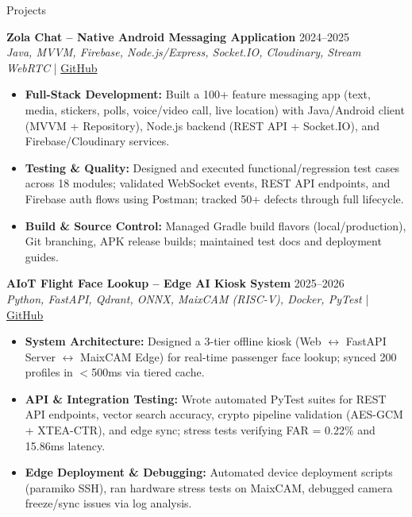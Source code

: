 \documentclass{resume}
\begin{document}
\begin{rSection}{Projects}
    \vspace{-0.6em}

    \item \textbf{Zola Chat -- Native Android Messaging Application} \hfill 2024--2025\\
    {\small \textit{Java, MVVM, Firebase, Node.js/Express, Socket.IO, Cloudinary, Stream WebRTC}} \hfill | \href{https://github.com/pckienuit}{GitHub}
    \begin{itemize}
        \itemsep -4pt {}
        \item \textbf{Full-Stack Development:} Built a 100+ feature messaging app (text, media, stickers, polls, voice/video call, live location) with Java/Android client (MVVM + Repository), Node.js backend (REST API + Socket.IO), and Firebase/Cloudinary services.
        \item \textbf{Testing \& Quality:} Designed and executed functional/regression test cases across 18 modules; validated WebSocket events, REST API endpoints, and Firebase auth flows using Postman; tracked 50+ defects through full lifecycle.
        \item \textbf{Build \& Source Control:} Managed Gradle build flavors (local/production), Git branching, APK release builds; maintained test docs and deployment guides.
    \end{itemize}

    \item \textbf{AIoT Flight Face Lookup -- Edge AI Kiosk System} \hfill 2025--2026\\
    {\small \textit{Python, FastAPI, Qdrant, ONNX, MaixCAM (RISC-V), Docker, PyTest}} \hfill | \href{https://github.com/pckienuit/AIoT_DoAn}{GitHub}
    \begin{itemize}
        \itemsep -4pt {}
        \item \textbf{System Architecture:} Designed a 3-tier offline kiosk (Web $\leftrightarrow$ FastAPI Server $\leftrightarrow$ MaixCAM Edge) for real-time passenger face lookup; synced 200 profiles in $<$500ms via tiered cache.
        \item \textbf{API \& Integration Testing:} Wrote automated PyTest suites for REST API endpoints, vector search accuracy, crypto pipeline validation (AES-GCM + XTEA-CTR), and edge sync; stress tests verifying FAR = 0.22\% and 15.86ms latency.
        \item \textbf{Edge Deployment \& Debugging:} Automated device deployment scripts (paramiko SSH), ran hardware stress tests on MaixCAM, debugged camera freeze/sync issues via log analysis.
    \end{itemize}

\end{rSection}
\end{document}
